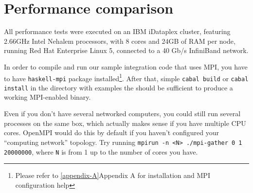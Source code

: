\documentclass{tmr}
\begin{document}
\section{Performance comparison}

All performance tests were executed on an IBM iDataplex cluster, featuring 2.66GHz Intel Nehalem processors, with 8 cores and
24GB of RAM per node, running Red Hat Enterprise Linux 5, connected to a 40 Gb/s InfiniBand network.

In order to compile and run our sample integration code that uses MPI, you have to
have \verb|haskell-mpi| package installed\footnote{Please refer to
  \ref{appendix-A}{Appendix A} for installation and MPI configuration help}. After that,
simple \verb|cabal build| or \verb|cabal install| in the directory
with examples the should be sufficient to produce a working MPI-enabled binary.

Even if you don't have several networked computers, you could still
run several processes on the same box, which actually makes sense if
you have multiple CPU cores. OpenMPI would do this by default if you
haven't configured your ``computing network'' topology. Try running
\verb|mpirun -n <N> ./mpi-gather 0 1 20000000|, where \verb|N| is
from 1 up to the number of cores you have.

\end{document}
